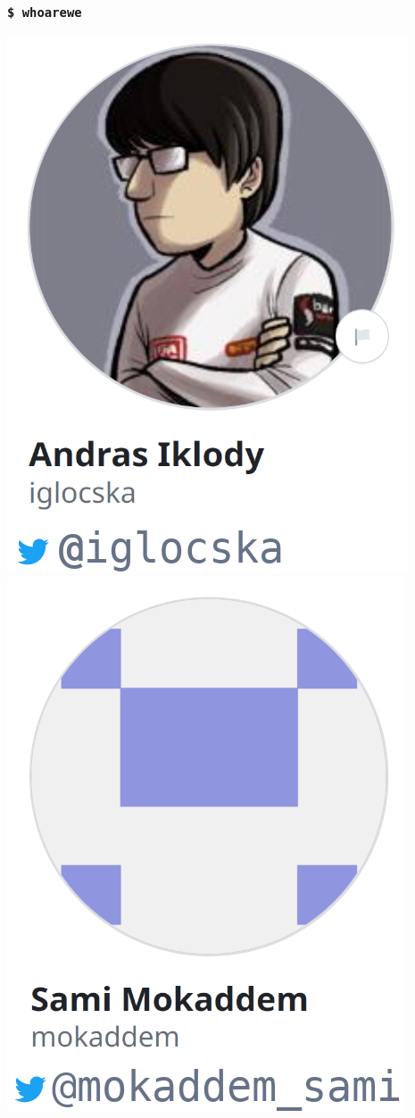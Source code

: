
\begin{frame}[t,plain]
\titlepage
\end{frame}

\begin{frame}
    \frametitle{\texttt{\$ whoarewe}}
    \begin{center}
        \includegraphics[width=0.25\linewidth]{pictures/whoarewe-andras.png}
        \qquad
        \includegraphics[width=0.25\linewidth]{pictures/whoarewe-sami.png}
    \end{center}
    \vspace{0.5em}
    \begin{center}
    \end{center}
\end{frame}

